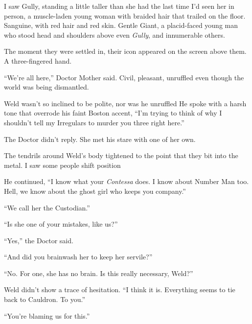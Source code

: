 I saw Gully, standing a little taller than she had the last time I'd seen her in person, a muscle-laden young woman with braided hair that trailed on the floor.  Sanguine, with red hair and red skin.  Gentle Giant, a placid-faced young man who stood head and shoulders above even \emph{Gully}, and innumerable others.



The moment they were settled in, their icon appeared on the screen above them.  A three-fingered hand.



``We're all here,'' Doctor Mother said.  Civil, pleasant, unruffled even though the world was being dismantled.



Weld wasn't so inclined to be polite, nor was he unruffled  He spoke with a harsh tone that overrode his faint Boston accent, ``I'm trying to think of why I shouldn't tell my Irregulars to murder you three right here.''



The Doctor didn't reply.  She met his stare with one of her own.



The tendrils around Weld's body tightened to the point that they bit into the metal.  I saw some people shift position



He continued, ``I know what your \emph{Contessa} does.  I know about Number Man too.  Hell, we know about the ghost girl who keeps you company.''



``We call her the Custodian.''



``Is she one of your mistakes, like us?''



``Yes,'' the Doctor said.



``And did you brainwash her to keep her servile?''



``No.  For one, she has no brain.  Is this really necessary, Weld?''



Weld didn't show a trace of hesitation.  ``I think it is.  Everything seems to tie back to Cauldron.  To you.''



``You're blaming us for this.''



